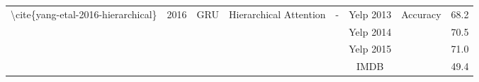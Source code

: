 \begin{table}[]
\begin{tabular}{|c|c|c|c|c|c|cc|}
    \multirow{6}{*}{\textbackslash{}cite\{yang-etal-2016-hierarchical\}}                  & \multirow{6}{*}{2016}                      & \multirow{6}{*}{GRU}                              & \multirow{6}{*}{Hierarchical Attention}                   & \multirow{6}{*}{-}                                                                                                     & Yelp 2013                                             & \multicolumn{1}{c|}{\multirow{6}{*}{Accuracy}}                                                                                     & 68.2                       \\ \cline{6-6} \cline{8-8} 
                                                                                          &                                            &                                                   &                                                           &                                                                                                                        & Yelp 2014                                             & \multicolumn{1}{c|}{}                                                                                                              & 70.5                       \\ \cline{6-6} \cline{8-8} 
                                                                                          &                                            &                                                   &                                                           &                                                                                                                        & Yelp 2015                                             & \multicolumn{1}{c|}{}                                                                                                              & 71.0                       \\ \cline{6-6} \cline{8-8} 
                                                                                          &                                            &                                                   &                                                           &                                                                                                                        & IMDB                                                  & \multicolumn{1}{c|}{}                                                                                                              & 49.4                       \\ \cline{6-6} \cline{8-8} 

\end{tabular}
\end{table}
